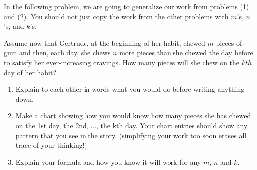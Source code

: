 \documentclass{ximera}
\begin{document}
In the following problem, we are going to generalize our work from problems (1) and (2).  You should not just copy the work from the other problems with $m$'s, $n$'s, and $k$'s.
\begin{problem}

Assume now that Gertrude, at the beginning of her habit, chewed $m$
pieces of gum and then, each day, she chews $n$ more pieces than she
chewed the day before to satisfy her ever-increasing cravings.  How many pieces will she chew on the $kth$
  day of her habit? 
\begin{enumerate}
    \item Explain to each other in words what you would do before writing anything down.
    \item Make a chart showing how you would know how many pieces she has chewed on the 1st day, the 2nd, ..., the kth day.  Your chart entries should show any pattern that you see in the story.  (simplifying  your work too soon erases all trace of your thinking!)
    \item  Explain your formula and how you know it will work for any $m$, $n$ and $k$.  
\end{enumerate}  
 
\end{problem}


\pagebreak
\end{document}
